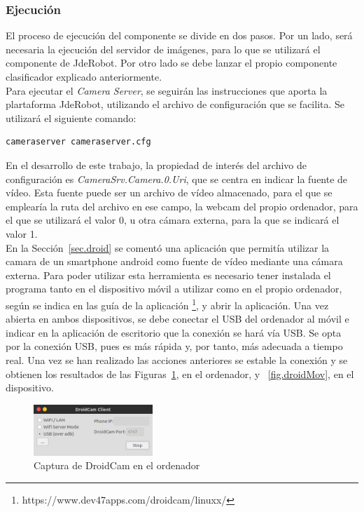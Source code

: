 \subsubsection{Ejecución}
El proceso de ejecución del componente se divide en dos pasos. Por un lado, será necesaria la ejecución del servidor de imágenes, para lo que se utilizará el componente de JdeRobot. Por otro lado se debe lanzar el propio componente clasificador explicado anteriormente.\\

Para ejecutar el \textit{Camera Server}, se seguirán las instrucciones que aporta la plartaforma JdeRobot, utilizando el archivo de configuración que se facilita. Se utilizará el siguiente comando: 
\vspace{10pt}
\begin{lstlisting}[frame=single]
	cameraserver cameraserver.cfg
\end{lstlisting}

En el desarrollo de este trabajo, la propiedad de interés del archivo de configuración es \textit{CameraSrv.Camera.0.Uri}, que se centra en indicar la fuente de vídeo. Esta fuente puede ser un archivo de vídeo almacenado, para el que se emplearía la ruta del archivo en ese campo, la webcam del propio ordenador, para el que se utilizará el valor 0, u otra cámara externa, para la que se indicará el valor 1.\\

En la Sección~\ref{sec.droid} se comentó una aplicación que permitía utilizar la camara de un smartphone android como fuente de vídeo mediante una cámara externa. Para poder utilizar esta herramienta es necesario tener instalada el programa tanto en el dispositivo móvil a utilizar como en el propio ordenador, según se indica en las guía de la aplicación \footnote{https://www.dev47apps.com/droidcam/linuxx/}, y abrir la aplicación. Una vez abierta en ambos dispositivos, se debe conectar el USB del ordenador al móvil e indicar en la aplicación de escritorio que la conexión se hará vía USB. Se opta por la conexión USB, pues es más rápida y, por tanto, más adecuada a tiempo real. Una vez se han realizado las acciones anteriores se estable la conexión y se obtienen los resultados de las Figuras~\ref{fig.droidEsc}, en el ordenador, y ~\ref{fig.droidMov}, en el dispositivo.\\

\begin{figure}[H]
	\begin{center}
		\includegraphics[width=0.4\textwidth]{figures/droidcamEscr}
		\caption{Captura de DroidCam en el ordenador}
		\label{fig.droidEsc}
	\end{center}
\end{figure}

